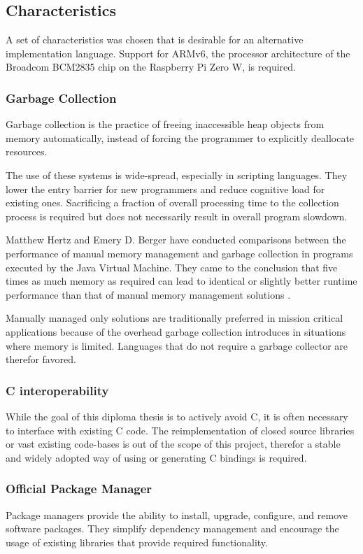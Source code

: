 \subsection{Characteristics}
A set of characteristics was chosen that is desirable for an alternative implementation language. Support for ARMv6, the processor architecture of the Broadcom BCM2835 chip on the Raspberry Pi Zero W, is required.

\subsubsection{Garbage Collection}
Garbage collection is the practice of freeing inaccessible heap objects from memory automatically, instead of forcing the programmer to explicitly deallocate resources.

The use of these systems is wide-spread, especially in scripting languages. They lower the entry barrier for new programmers and reduce cognitive load for existing ones. Sacrificing a fraction of overall processing time to the collection process is required but does not necessarily result in overall program slowdown. 

Matthew Hertz and Emery D. Berger have conducted comparisons between the performance of manual memory management and garbage collection in programs executed by the Java Virtual Machine. They came to the conclusion that five times as much memory as required can lead to identical or slightly better runtime performance than that of manual memory management solutions \cite{garbage-collection-vs-manual}. 

Manually managed only solutions are traditionally preferred in mission critical applications because of the overhead garbage collection introduces in situations where memory is limited. Languages that do not require a garbage collector are therefor favored.

\subsubsection{C interoperability}
While the goal of this diploma thesis is to actively avoid C, it is often necessary to interface with existing C code. The reimplementation of closed source libraries or vast existing code-bases is out of the scope of this project, therefor a stable and widely adopted way of using or generating C bindings is required.

\subsubsection{Official Package Manager}
Package managers provide the ability to install, upgrade, configure, and remove software packages. They simplify dependency management and encourage the usage of existing libraries that provide required functionality. 

